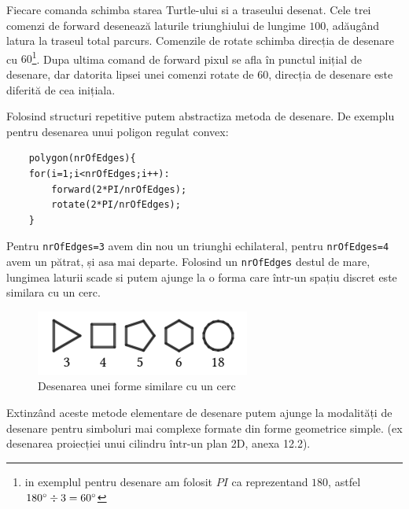 Fiecare comanda schimba starea Turtle-ului si a traseului desenat. 
Cele trei comenzi de forward desenează laturile triunghiului de lungime \(100\), adăugând latura la traseul total parcurs. 
Comenzile de rotate schimba direcția de desenare cu \(60\)\degree \footnote{in exemplul pentru desenare am folosit \(PI\) ca reprezentand \(180\)\degree, astfel \(180\degree \div 3 = 60\degree\)}. 
Dupa ultima comand de forward pixul se afla în punctul inițial de desenare, dar datorita lipsei unei comenzi rotate de \(60\)\degree, 
direcția de desenare este diferită de cea inițiala.\newline

Folosind structuri repetitive putem abstractiza metoda de desenare. De exemplu pentru desenarea unui poligon regulat convex:

\begin{lstlisting}
    polygon(nrOfEdges){
    for(i=1;i<nrOfEdges;i++):
        forward(2*PI/nrOfEdges);
        rotate(2*PI/nrOfEdges);	
    }
\end{lstlisting}

Pentru \verb|nrOfEdges=3| avem din nou un triunghi echilateral, pentru \verb|nrOfEdges=4| avem un pătrat, și asa mai departe. 
Folosind un \verb|nrOfEdges| destul de mare, lungimea laturii scade si  putem ajunge la o forma care într-un spațiu discret 
este similara cu un cerc.\newline 

\begin{figure}[H]
    \begin{center}
        \includegraphics[scale=1]{imagini/turtle/circle.png}
        \caption{Desenarea unei forme similare cu un cerc \protect\footnotemark}
        \label{fig:tabs}
    \end{center}    
\end{figure}


Extinzând aceste metode elementare de desenare putem ajunge la modalități de desenare pentru simboluri mai complexe 
formate din forme geometrice simple. (ex desenarea proiecției unui cilindru într-un plan 2D, anexa 12.2). \newline

